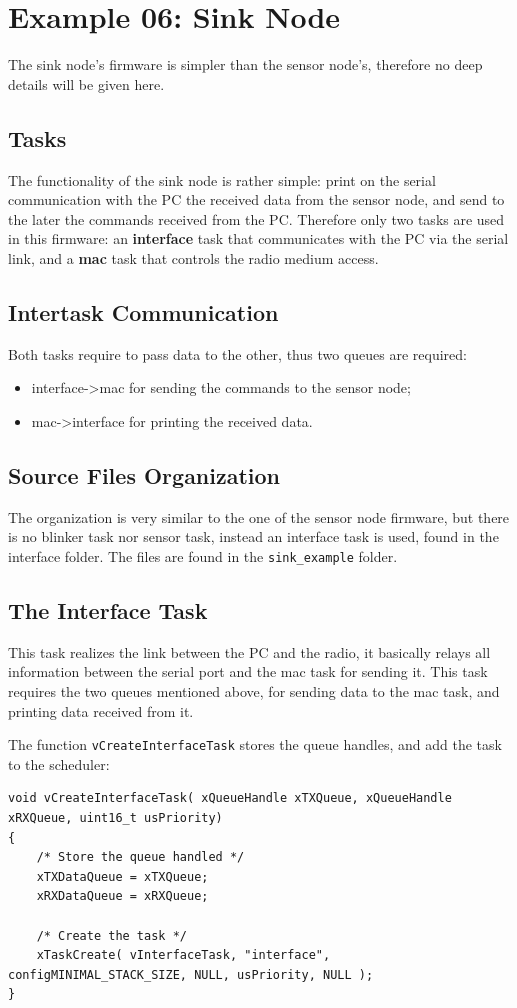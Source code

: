 \documentclass[11pt]{report}
\begin{document}
\section{Example 06: Sink Node}
The sink node's firmware is simpler than the sensor node's, therefore no deep details will be given here.

\subsection{Tasks}
The functionality of the sink node is rather simple: print on the serial communication with the PC the received data from the sensor node, and send to the later the commands received from the PC.
Therefore only two tasks are used in this firmware: an \textbf{interface} task that communicates with the PC via the serial link, and a \textbf{mac} task that controls the radio medium access.

\subsection{Intertask Communication}
Both tasks require to pass data to the other, thus two queues are required:
\begin{itemize}
	\item interface-\textgreater mac for sending the commands to the sensor node;
	\item mac-\textgreater interface for printing the received data.
\end{itemize}

\subsection{Source Files Organization}
The organization is very similar to the one of the sensor node firmware, but there is no blinker task nor sensor task, instead an interface task is used, found in the interface folder. The files are found in the \verb$sink_example$ folder.

\subsection{The Interface Task}
This task realizes the link between the PC and the radio, it basically relays all information between the serial port and the mac task for sending it.
This task requires the two queues mentioned above, for sending data to the mac task, and printing data received from it.

The function \verb$vCreateInterfaceTask$ stores the queue handles, and add the task to the scheduler:
\begin{verbatim}
void vCreateInterfaceTask( xQueueHandle xTXQueue, xQueueHandle xRXQueue, uint16_t usPriority)
{
    /* Store the queue handled */
    xTXDataQueue = xTXQueue;
    xRXDataQueue = xRXQueue;
        
    /* Create the task */
    xTaskCreate( vInterfaceTask, "interface", configMINIMAL_STACK_SIZE, NULL, usPriority, NULL );
}
\end{verbatim}
\end{document}
